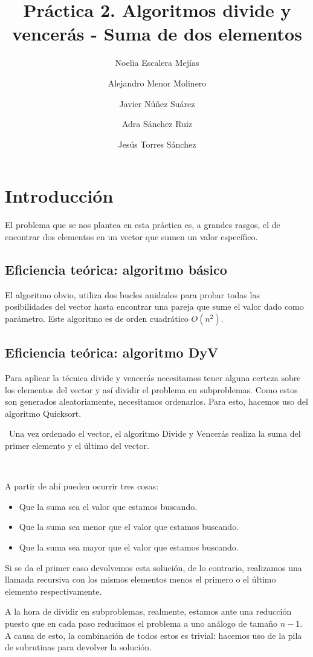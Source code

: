 \documentclass{article}
\title{Práctica 2. Algoritmos divide y vencerás - Suma de dos elementos}
\author{Noelia Escalera Mejías \\
		\and Alejandro Menor Molinero \\
		\and Javier Núñez Suárez \\
		\and Adra Sánchez Ruiz \\
		\and Jesús Torres Sánchez}
\begin{document}
	\maketitle
	\section{Introducción}
	El problema que se nos plantea en esta práctica es, a grandes rasgos, el de encontrar dos elementos en un vector que sumen un valor específico. 
	
	
	\subsection{Eficiencia teórica: algoritmo básico}
	
	El algoritmo obvio, utiliza dos bucles anidados para probar todas las posibilidades del vector hasta encontrar una pareja que sume el valor dado como parámetro.
	Este algoritmo es de orden cuadrático $O(n^2)$.
	
	
	\subsection{Eficiencia teórica: algoritmo DyV}
	Para aplicar la técnica divide y vencerás necesitamos tener alguna certeza sobre los elementos del vector y así dividir el problema en subproblemas. Como estos son generados aleatoriamente, necesitamos ordenarlos.
	Para esto, hacemos uso del algoritmo Quicksort.
	
	\
	Una vez ordenado el vector, el algoritmo Divide y Vencerás realiza la suma del primer elemento y el último del vector.
	
	\
	
	A partir de ahí pueden ocurrir tres cosas:
	\begin{itemize}
		\item Que la suma sea el valor que estamos buscando.
		\item Que la suma sea menor que el valor que estamos buscando.
		\item Que la suma sea mayor que el valor que estamos buscando.
	\end{itemize}

	Si se da el primer caso devolvemos esta solución, de lo contrario, realizamos una llamada recursiva con los mismos elementos menos el primero o el último elemento respectivamente.
	\
	
	A la hora de dividir en subproblemas, realmente, estamos ante una reducción puesto que en cada paso reducimos el problema a uno análogo de tamaño $n-1$. A causa de esto, la combinación de todos estos es trivial: hacemos uso de la pila de subrutinas para devolver la solución.
	\
	
\end{document}
